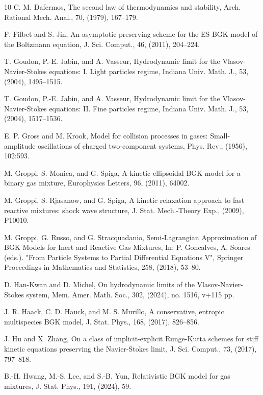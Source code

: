 \documentclass[10pt,reqno]{amsart}
\numberwithin{equation}{section}
\begin{document}
\begin{thebibliography}{10}
 C. M. Dafermos, The second law of thermodynamics and stability, Arch. Rational Mech. Anal., 70, (1979), 167--179.

 F. Filbet and S. Jin, An asymptotic preserving scheme for the ES-BGK model of the Boltzmann equation, J. Sci. Comput., 46, (2011), 204--224.

 T. Goudon, P.-E. Jabin, and A. Vasseur, Hydrodynamic limit for the Vlasov-Navier-Stokes equations: I. Light particles regime, Indiana Univ. Math. J., 53, (2004), 1495--1515.

 T. Goudon, P.-E. Jabin, and A. Vasseur, Hydrodynamic limit for the Vlasov-Navier-Stokes equations: II. Fine particles regime, Indiana Univ. Math. J., 53, (2004), 1517--1536. 

E. P. Gross and M. Krook,  Model for collision processes in gases: Small-amplitude oscillations of charged two-component systems, Phys. Rev., (1956), 102:593.

M. Groppi, S. Monica, and G. Spiga, A kinetic ellipsoidal BGK model for a binary gas mixture, Europhysics Letters, 96, (2011), 64002.

M. Groppi, S. Rjasanow, and G. Spiga,  A kinetic relaxation approach to fast reactive mixtures: shock wave structure, J. Stat. Mech.-Theory Exp., (2009), P10010.

M. Groppi, G. Russo, and G. Stracquadanio, Semi-Lagrangian Approximation of BGK Models for Inert and Reactive Gas Mixtures, In: P. Goncalves, A. Soares (eds.). "From Particle Systems to Partial Differential Equations V", Springer Proceedings in Mathematics and Statistics, 258, (2018), 53--80.

 D. Han-Kwan and D. Michel, On hydrodynamic limits of the Vlasov-Navier-Stokes system, Mem. Amer. Math. Soc., 302, (2024), no. 1516, v+115 pp.

  J. R. Haack, C. D. Hauck, and M. S.  Murillo, A conservative, entropic multispecies BGK model, J. Stat. Phys., 168, (2017), 826--856.
 
  J. Hu and X. Zhang, On a class of implicit-explicit Runge-Kutta schemes for stiff kinetic equations preserving the Navier-Stokes limit, J. Sci. Comput., 73, (2017), 797--818.

 B.-H. Hwang, M.-S. Lee, and S.-B. Yun, Relativistic BGK model for gas mixtures, J. Stat. Phys., 191, (2024), 59.


\end{thebibliography}
\end{document}
